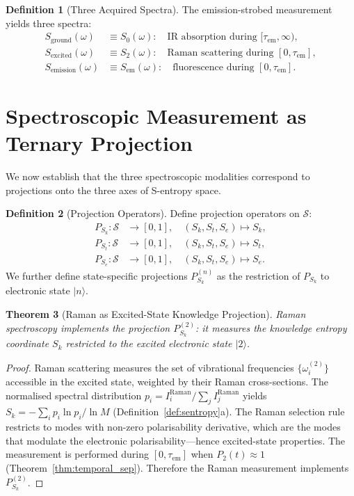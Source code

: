 \documentclass[11pt,a4paper]{article}
\newtheorem{theorem}{Theorem}[section]
\theoremstyle{definition}
\newtheorem{definition}[theorem]{Definition}
\theoremstyle{remark}
\newcommand{\Sk}{S_k}
\newcommand{\St}{S_t}
\newcommand{\Se}{S_e}
\newcommand{\Sspace}{\mathcal{S}}
\begin{document}
\begin{definition}[Three Acquired Spectra]
\label{def:three_spectra}
The emission-strobed measurement yields three spectra:
\begin{align}
S_{\mathrm{ground}}(\omega) &\equiv S_0(\omega): \quad \text{IR absorption during } [\tau_{\mathrm{em}}, \infty), \\
S_{\mathrm{excited}}(\omega) &\equiv S_2(\omega): \quad \text{Raman scattering during } [0, \tau_{\mathrm{em}}], \\
S_{\mathrm{emission}}(\omega) &\equiv S_{\mathrm{em}}(\omega): \quad \text{fluorescence during } [0, \tau_{\mathrm{em}}].
\end{align}
\end{definition}

\section{Spectroscopic Measurement as Ternary Projection}
\label{sec:projection}

We now establish that the three spectroscopic modalities correspond to projections onto the three axes of S-entropy space.

\begin{definition}[Projection Operators]
\label{def:projections}
Define projection operators on $\Sspace$:
\begin{align}
P_{\Sk}: \Sspace &\to [0,1], \quad (\Sk, \St, \Se) \mapsto \Sk, \\
P_{\St}: \Sspace &\to [0,1], \quad (\Sk, \St, \Se) \mapsto \St, \\
P_{\Se}: \Sspace &\to [0,1], \quad (\Sk, \St, \Se) \mapsto \Se.
\end{align}
We further define state-specific projections $P_{\Sk}^{(n)}$ as the restriction of $P_{\Sk}$ to electronic state $|n\rangle$.
\end{definition}

\begin{theorem}[Raman as Excited-State Knowledge Projection]
\label{thm:raman_proj}
Raman spectroscopy implements the projection $P_{\Sk}^{(2)}$: it measures the knowledge entropy coordinate $\Sk$ restricted to the excited electronic state $|2\rangle$.
\end{theorem}

\begin{proof}
Raman scattering measures the set of vibrational frequencies $\{\omega_i^{(2)}\}$ accessible in the excited state, weighted by their Raman cross-sections. The normalised spectral distribution $p_i = I_i^{\mathrm{Raman}} / \sum_j I_j^{\mathrm{Raman}}$ yields $\Sk = -\sum_i p_i \ln p_i / \ln M$ (Definition~\ref{def:sentropy}a). The Raman selection rule restricts to modes with non-zero polarisability derivative, which are the modes that modulate the electronic polarisability---hence excited-state properties. The measurement is performed during $[0, \tau_{\mathrm{em}}]$ when $P_2(t) \approx 1$ (Theorem~\ref{thm:temporal_sep}). Therefore the Raman measurement implements $P_{\Sk}^{(2)}$.
\end{proof}
\end{document}
